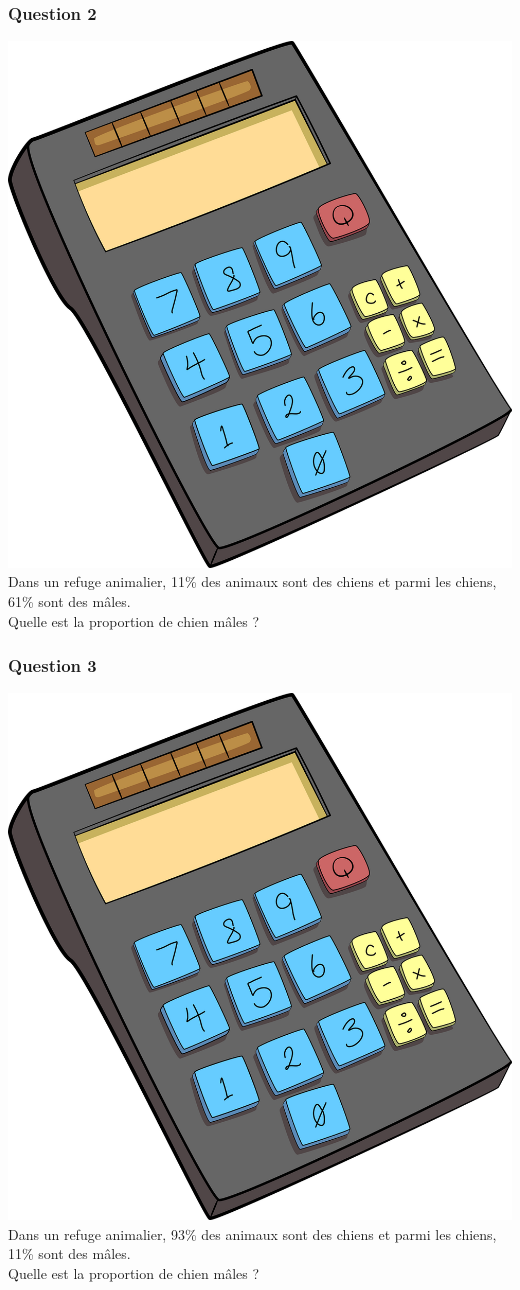\documentclass[15pt, mathserif]{beamer}
\begin{document}
\begin{frame} 
	\frametitle{Question 2}
\includegraphics[scale=0.01]{calculatrice} Dans un refuge animalier, 11\% des animaux sont des chiens et parmi les chiens, 61\% sont des mâles. \\ Quelle est la proportion de chien mâles ?\end{frame}


\begin{frame} 
	\frametitle{Question 3}
\includegraphics[scale=0.01]{calculatrice} Dans un refuge animalier, 93\% des animaux sont des chiens et parmi les chiens, 11\% sont des mâles. \\ Quelle est la proportion de chien mâles ?\end{frame}
\end{document}
